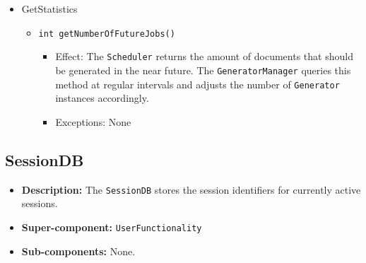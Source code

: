 \documentclass[a4paper,10pt]{article}
\begin{document}
\begin{itemize}
      \item GetStatistics
    \begin{itemize}
        \item \texttt{int getNumberOfFutureJobs()}
        \begin{itemize}
            \item Effect: The \texttt{Scheduler} returns the amount of documents that should be generated in the near future. The \texttt{GeneratorManager} queries this method at regular intervals and adjusts the number of \texttt{Generator} instances accordingly.
            \item Exceptions: None
        \end{itemize}
    \end{itemize}
\end{itemize}

\subsection{SessionDB}
\begin{itemize}
    \item \textbf{Description:} The \texttt{SessionDB} stores the session identifiers for currently active sessions.
    \item \textbf{Super-component:} \texttt{UserFunctionality}
    \item \textbf{Sub-components:} None.
\end{itemize}
\end{document}

